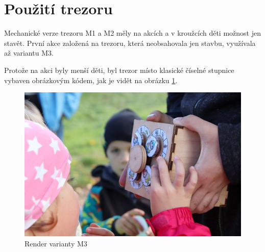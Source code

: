 \section{Použití trezoru}
Mechanické verze trezoru M1 a M2 měly na akcích a v kroužcích děti možnost jen stavět. První akce založená na trezoru, která neobsahovala jen stavbu, využívala až variantu M3.

Protože na akci byly menší děti, byl trezor místo klasické číselné stupnice  vybaven obrázkovým kódem, jak je vidět na obrázku \ref{fig:M3-trpaslici}.

\begin{figure}[htbp]
    \centering
    \includegraphics[width=\textwidth]{kapitoly/obrazky/M3/trpaslici.png}
    \caption{Render varianty M3}
    \label{fig:M3-trpaslici}
\end{figure}